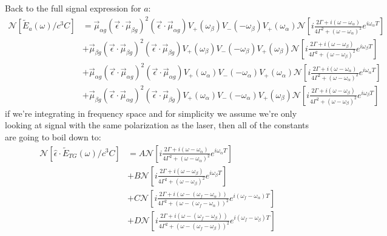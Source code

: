 Back to the full signal expression for $a$:
\begin{align*}
	\mathcal{N} \left[\tilde{E}_a (\omega) / c^3 C\right] &= \vec{\mu}_{\alpha g} \left( \vec{\epsilon} \cdot \vec{\mu}_{\beta g} \right)^2 \left( \vec{\epsilon} \cdot \vec{\mu}_{\alpha g} \right) V_{+}(\omega_{\beta})V_{-}(-\omega_{\beta})V_{+}(\omega_{\alpha})\mathcal{N}  \left[ i   \frac{2 \Gamma + i \left( \omega - \omega_{\alpha}\right)}{4 \Gamma^2 +  \left( \omega - \omega_{\alpha}\right)^2} e^{i \omega_{\alpha} T}   \right] \\
	&+  \vec{\mu}_{\beta g} \left( \vec{\epsilon} \cdot \vec{\mu}_{\beta g} \right)^2 \left( \vec{\epsilon} \cdot \vec{\mu}_{\beta g} \right)V_{+}(\omega_{\beta})V_{-}(-\omega_{\beta})V_{+}(\omega_{\beta})  \mathcal{N} \left[i      \frac{2 \Gamma + i \left( \omega - \omega_{\beta}\right)}{4 \Gamma^2 +  \left( \omega - \omega_{\beta}\right)^2} e^{i \omega_{\beta} T }   \right] \\
	&+  \vec{\mu}_{\alpha g} \left( \vec{\epsilon} \cdot \vec{\mu}_{\alpha g} \right)^2 \left( \vec{\epsilon} \cdot \vec{\mu}_{\alpha g} \right) V_{+}(\omega_{\alpha})V_{-}(-\omega_{\alpha})V_{+}(\omega_{\alpha}) \mathcal{N} \left[  i   \frac{2 \Gamma + i \left( \omega - \omega_{\alpha}\right)}{4 \Gamma^2 +  \left( \omega - \omega_{\alpha}\right)^2} e^{i \omega_{\alpha} T}  \right] \\
	&+  \vec{\mu}_{\beta g} \left( \vec{\epsilon} \cdot \vec{\mu}_{\alpha g} \right)^2 \left( \vec{\epsilon} \cdot \vec{\mu}_{\beta g} \right) V_{+}(\omega_{\alpha})V_{-}(-\omega_{\alpha})V_{+}(\omega_{\beta}) \mathcal{N} \left[ i \frac{2 \Gamma + i \left( \omega - \omega_{\beta}\right)}{4 \Gamma^2 +  \left( \omega - \omega_{\beta}\right)^2} e^{i \omega_{\beta} T}   \right]
\end{align*}
if we're integrating in frequency space and for simplicity we assume we're only looking at signal with the same polarization as the laser, then all of the constants are going to boil down to:
\begin{align*}
	\mathcal{N} \left[\hat{\epsilon} \cdot \tilde{E}_{TG} (\omega) / c^3 C\right] &= A \mathcal{N}  \left[ i   \frac{2 \Gamma + i \left( \omega - \omega_{\alpha}\right)}{4 \Gamma^2 +  \left( \omega - \omega_{\alpha}\right)^2} e^{i \omega_{\alpha} T}   \right] \\
	&+  B  \mathcal{N} \left[i      \frac{2 \Gamma + i \left( \omega - \omega_{\beta}\right)}{4 \Gamma^2 +  \left( \omega - \omega_{\beta}\right)^2} e^{i \omega_{\beta} T }   \right] \\
	&+  C  \mathcal{N} \left[i      \frac{2 \Gamma + i \left( \omega - \left(  \omega_f - \omega_{\alpha}\right) \right)}{4 \Gamma^2 +  \left( \omega - \left(  \omega_f - \omega_{\alpha}\right)\right)^2} e^{i \left(  \omega_f - \omega_{\alpha}\right) T }   \right] \\
	&+  D  \mathcal{N} \left[i      \frac{2 \Gamma + i \left( \omega -  \left(  \omega_f - \omega_{\beta}\right)\right)}{4 \Gamma^2 +  \left( \omega -  \left(  \omega_f - \omega_{\beta}\right)\right)^2} e^{i  \left(  \omega_f - \omega_{\beta}\right) T }   \right]
\end{align*}
